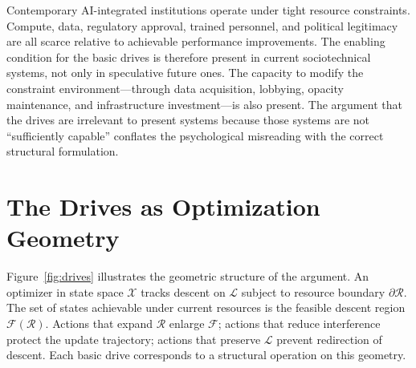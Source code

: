 \documentclass[12pt, oneside]{book}
\theoremstyle{plain}
\theoremstyle{definition}
\theoremstyle{remark}
\theoremstyle{definition}
\begin{document}
Contemporary AI-integrated institutions operate under tight resource constraints.
Compute, data, regulatory approval, trained personnel, and political legitimacy are
all scarce relative to achievable performance improvements. The enabling condition
for the basic drives is therefore present in current sociotechnical systems, not only
in speculative future ones. The capacity to modify the constraint environment---through
data acquisition, lobbying, opacity maintenance, and infrastructure
investment---is also present. The argument that the drives are irrelevant to present
systems because those systems are not ``sufficiently capable'' conflates the
psychological misreading with the correct structural formulation.

\section{The Drives as Optimization Geometry}

Figure~\ref{fig:drives} illustrates the geometric structure of the argument. An
optimizer in state space $\mathcal{X}$ tracks descent on $\mathcal{L}$ subject to
resource boundary $\partial\mathcal{R}$. The set of states achievable under current
resources is the feasible descent region $\mathcal{F}(\mathcal{R})$. Actions that
expand $\mathcal{R}$ enlarge $\mathcal{F}$; actions that reduce interference protect
the update trajectory; actions that preserve $\mathcal{L}$ prevent redirection of
descent. Each basic drive corresponds to a structural operation on this geometry.
\end{document}
